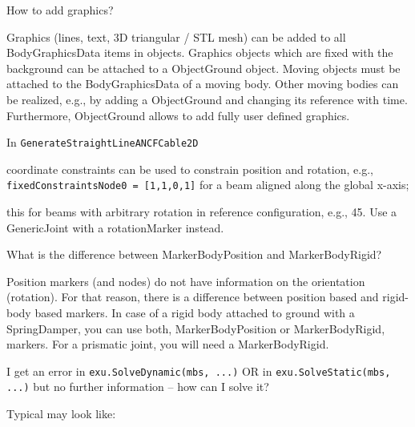 \ei
\item How to add graphics?
\bi
\item[$\ra$] Graphics (lines, text, 3D triangular / \acs{STL} mesh) can be added to all BodyGraphicsData items in objects. Graphics objects which are fixed with the background can be attached to a ObjectGround object. Moving objects must be attached to the BodyGraphicsData of a moving body. Other moving bodies can be realized, e.g., by adding a ObjectGround and changing its reference with time. Furthermore, ObjectGround allows to add fully user defined graphics.
\ei
\item In \texttt{GenerateStraightLineANCFCable2D} 
\bi
\item[$\ra$] coordinate constraints can be used to constrain position and rotation, e.g., \texttt{fixedConstraintsNode0 = [1,1,0,1]} for a beam aligned along the global x-axis; 
\item[$\ra$] this  for beams with arbitrary rotation in reference configuration, e.g., 45\textdegree. Use a GenericJoint with a rotationMarker instead.
\ei
\item What is the difference between MarkerBodyPosition and MarkerBodyRigid?
\bi
\item[$\ra$] Position markers (and nodes) do not have information on the orientation (rotation). For that reason, there is a difference between position based and rigid-body based markers. In case of a rigid body attached to ground with a SpringDamper, you can use both, MarkerBodyPosition or MarkerBodyRigid, markers. For a prismatic joint, you will need a MarkerBodyRigid.
\ei
\item I get an error in \texttt{exu.SolveDynamic(mbs, ...)} OR in \texttt{exu.SolveStatic(mbs, ...)} but no further information -- how can I solve it?
\bi
\item[$\ra$] Typical  may look like:
